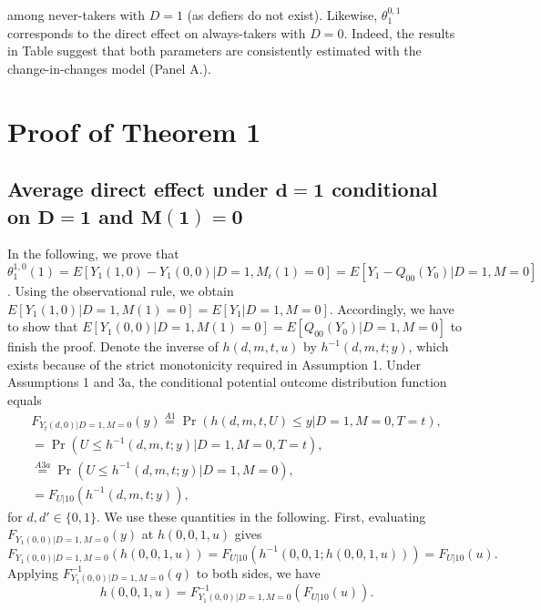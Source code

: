 \documentclass[a4paper,12pt]{article}
\begin{document}
 \doublespacing \pagestyle{plain}
among never-takers with $D=1$ (as defiers do not exist). Likewise, $\theta_1^{0,1}$ corresponds to the direct effect on always-takers with $D=0$. Indeed, the results in Table  suggest that both parameters are consistently estimated with the change-in-changes model (Panel A.).
\section{Proof of Theorem 1 }
\subsection{Average direct effect under $\mathbf{d=1}$ conditional on $\mathbf{D=1}$ and $\mathbf{M(1)=0}$}
In the following, we prove that $\theta_1^{1,0}(1)= E[Y_1(1,0)-Y_1(0,0)|D=1,M_i (1)=0]=  E[Y_1-Q_{00}(Y_0)|D=1,M=0]$. Using the observational rule, we obtain $E[Y_1(1,0)|D=1,M(1)=0]=E[Y_1|D=1,M=0]$. Accordingly, we have to show that $E[Y_1(0,0)|D=1,M(1)=0]=E[Q_{00}(Y_0)|D=1,M=0]$ to finish the proof.
Denote the inverse of $h(d,m,t,u)$ by $h^{-1}(d,m,t;y)$, which exists because of the strict monotonicity required in Assumption 1. Under Assumptions 1 and 3a, the conditional potential outcome distribution function equals
\begin{equation} 
\begin{array}{rl}
 F_{Y_t(d,0)|D=1,M=0}(y)  \stackrel{A1}{=} \Pr(h(d,m,t,U) \leq y|D=1,M=0,T=t) ,\\
= \Pr(U \leq h^{-1}(d,m,t;y)|D=1,M=0,T=t) ,\\
\stackrel{A3a}{=} \Pr(U \leq h^{-1}(d,m,t;y)|D=1,M=0) ,\\
= F_{U|10} ( h^{-1}(d,m,t;y)),
\end{array}
\end{equation}
for $d,d' \in \{0,1\}$. We use these quantities in the following.
First, evaluating $F_{Y_1(0,0)|D=1,M=0}(y)$ at $h(0,0,1,u)$ gives
\begin{equation*}
F_{Y_1(0,0)|D=1,M=0}(h(0,0,1,u)) = F_{U|10} ( h^{-1}(0,0,1;h(0,0,1,u)))  =F_{U|10} ( u).
\end{equation*}
Applying $F_{Y_1(0,0)|D=1,M=0}^{-1}(q)$ to both sides, we have
\begin{equation} 
h(0,0,1,u)  =F_{Y_1(0,0)|D=1,M=0}^{-1}(F_{U|10} ( u)).
\end{equation}
\end{document}

